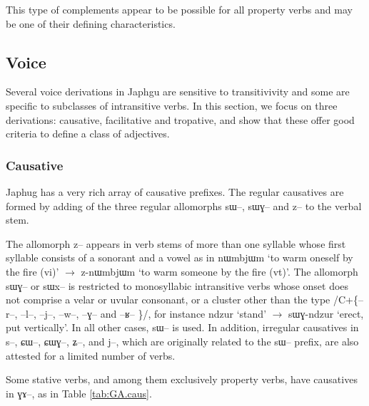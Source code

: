\documentclass[oldfontcommands,oneside,a4paper,11pt]{article}
\newcommand{\ipa}[1]{{\phon \mbox{#1}}} %
\begin{document}
This type of complements appear to be possible for all property verbs and may be one of their defining characteristics.


\subsection{Voice}

Several voice derivations in Japhgu are sensitive to transitivivity and some are specific to subclasses of intransitive verbs. In this section, we focus on three derivations: causative, facilitative and tropative, and show that these offer good criteria to define a class of adjectives.


\subsubsection{Causative}
Japhug has a very rich array of causative prefixes. The regular causatives are formed by adding of the three regular allomorphs \ipa{sɯ--}, \ipa{sɯɣ--} and \ipa{z--} to the verbal stem. 

The allomorph \ipa{z--}  appears in verb stems of more than one syllable whose first syllable consists of a sonorant and a vowel as in \ipa{nɯmbjɯm} `to warm oneself by the fire (vi)' $\rightarrow$  \ipa{z-nɯmbjɯm} `to warm someone by the fire (vt)'. The allomorph \ipa{sɯɣ--} or \ipa{sɯx--} is restricted to monosyllabic intransitive verbs whose onset does not comprise a velar or uvular consonant, or a cluster other than the type /C+\{\ipa{--r--}, \ipa{--l--}, \ipa{--j--}, \ipa{--w--}, \ipa{--ɣ--} and \ipa{--ʁ--} \}/, for instance \ipa{ndzur} `stand' $\rightarrow$ \ipa{sɯɣ-ndzur} `erect, put vertically'. In all other cases, \ipa{sɯ--} is used. In addition, irregular causatives in \ipa{s--}, \ipa{ɕɯ--}, \ipa{ɕɯɣ--}, \ipa{ʑ--}, and \ipa{j--}, which are originally related to the \ipa{sɯ--} prefix, are also attested for a limited number of verbs. 

Some stative verbs, and among them exclusively property verbs, have causatives in \ipa{ɣɤ--}, as in Table \ref{tab:GA.caus}.
\end{document}

